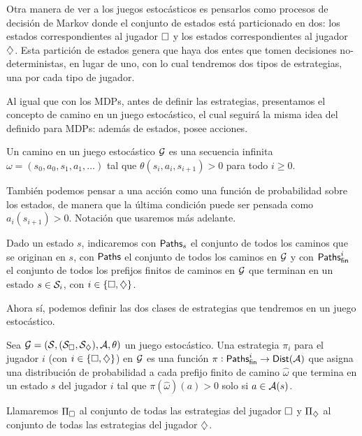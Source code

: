 Otra manera de ver a los juegos estocásticos es pensarlos como procesos de
decisión de Markov donde el conjunto de estados está particionado en dos: los
estados correspondientes al jugador $\square$ y los estados correspondientes al
jugador $\diamondsuit$. Esta partición de estados genera que haya dos entes que tomen
decisiones no-deterministas, en lugar de uno, con lo cual tendremos dos tipos
de estrategias, una por cada tipo de jugador.

Al igual que con los MDPs, antes de definir las estrategias, presentamos el
concepto de camino en un juego estocástico, el cual seguirá la misma idea del
definido para MDPs: además de estados, posee acciones.

\begin{definition}
	Un camino en un juego estocástico $\mathcal{G}$ es una secuencia infinita $\omega = (s_0, a_0, s_1, a_1, \dots)$ tal que $\theta(s_i, a_i, s_{i+1}) > 0$ para todo $i \geq 0$.

	También podemos pensar a una acción como una función de probabilidad sobre los
	estados, de manera que la última condición puede ser pensada como $a_i(s_{i+1})
		> 0$. Notación que usaremos más adelante.

	Dado un estado $s$, indicaremos con $\textsf{Paths}_s$ el conjunto de todos los caminos
	que se originan en $s$, con $\textsf{Paths}$ el conjunto de todos los caminos en $\mathcal{G}$ y
	con $\textsf{Paths}_\textsf{fin}^i$ el conjunto de todos los prefijos finitos de caminos en $\mathcal{G}$
	que terminan en un estado $s \in \mathcal{S}_i$, con $i \in \{\square, \diamondsuit\}$.
\end{definition}

Ahora sí, podemos definir las dos clases de estrategias que tendremos en un
juego estocástico.

\begin{definition}
	Sea $\mathcal{G} = (\mathcal{S}, (\mathcal{S}_\square, \mathcal{S}_\diamondsuit), \mathcal{A}, \theta)$ un juego estocástico. Una estrategia $\pi_i$ para el jugador $i$ (con $i \in \{\square, \diamondsuit\}$) en $\mathcal{G}$ es una función $\pi: \textsf{Paths}_\textsf{fin}^i \rightarrow \mathsf{Dist} (\mathcal{A})$ que asigna una distribución de probabilidad a cada prefijo finito de camino $\hat \omega$ que termina en un estado $s$ del jugador $i$ tal que $\pi(\hat \omega) (a) > 0$ solo si $a \in \mathcal{A}(s)$.

	Llamaremos $\Pi_\square$ al conjunto de todas las estrategias del jugador $\square$
	y $\Pi_\diamondsuit$ al conjunto de todas las estrategias del jugador $\diamondsuit$.
\end{definition}

